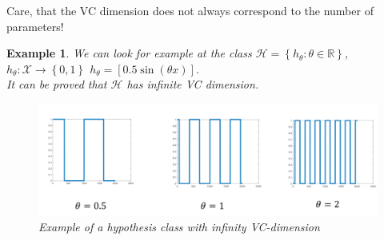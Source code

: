 \documentclass[12pt]{report}
\theoremstyle{plain}
\newtheorem{example}{Example}[chapter]
\newcommand\mcl[1]{\mathcal{#1}}
\begin{document}
\begin{flushleft}
Care, that the VC dimension does not always correspond to the number of 
parameters!
\begin{example}
	We can look for example at the class 
	$\mcl{H}=\left\{h_\theta:\theta\in\mathds{R}\right\}$, 
	$h_\theta:\mcl{X}\to\left\{0,1\right\}$ $h_\theta=\left[0.5\sin(\theta 
	x)\right]$.\\
	It can be proved that $\mcl{H}$ has infinite VC dimension.
	\begin{figure}[!h]
		\centering
		\includegraphics[scale=0.6]{images/ex_infty_VCdim.pdf}
		\caption{Example of a hypothesis class with infinity VC-dimension}
	\end{figure}
\end{example}


\end{flushleft}
\end{document}
